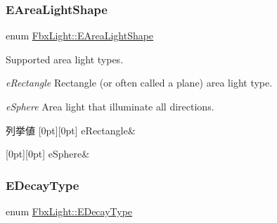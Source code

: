 \subsubsection{\texorpdfstring{E\+Area\+Light\+Shape}{EAreaLightShape}}
{\footnotesize\ttfamily enum \hyperlink{class_fbx_light_a9bc60eabc41255f46f35d1f6acd274cd}{Fbx\+Light\+::\+E\+Area\+Light\+Shape}}

Supported area light types.
\begin{DoxyItemize}
\item {\itshape e\+Rectangle} Rectangle (or often called a plane) area light type.
\item {\itshape e\+Sphere} Area light that illuminate all directions. 
\end{DoxyItemize}\begin{DoxyEnumFields}{列挙値}
[0pt][0pt]{}\mbox{\label{class_fbx_light_a9bc60eabc41255f46f35d1f6acd274cda3ad60ea65faa6a6b1c0a81c5cb014ec9}} 
e\+Rectangle&\\
\hline

[0pt][0pt]{}\mbox{\label{class_fbx_light_a9bc60eabc41255f46f35d1f6acd274cda2e2d016a7ad503ff88a90cc12ded0347}} 
e\+Sphere&\\
\hline

\end{DoxyEnumFields}
\mbox{\label{class_fbx_light_a940254a9a826ab44a4cde044db1b3875}} 
\subsubsection{\texorpdfstring{E\+Decay\+Type}{EDecayType}}
{\footnotesize\ttfamily enum \hyperlink{class_fbx_light_a940254a9a826ab44a4cde044db1b3875}{Fbx\+Light\+::\+E\+Decay\+Type}}

